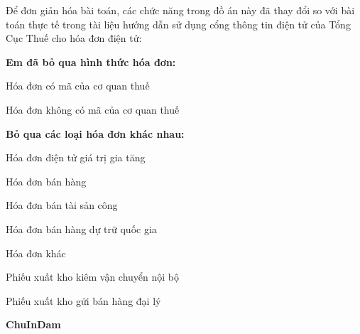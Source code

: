 Để đơn giản hóa bài toán, các chức năng trong đồ án này đã thay đổi so với bài toán thực tế trong tài liệu hướng dẫn sử dụng cổng thông tin điện tử của Tổng Cục Thuế cho hóa đơn điện tử:







\textbf{Em đã bỏ qua hình thức hóa đơn:}







Hóa đơn có mã của cơ quan thuế







Hóa đơn không có mã của cơ quan thuế







\textbf{Bỏ qua các loại hóa đơn khác nhau:}







Hóa đơn điện tử giá trị gia tăng







Hóa đơn bán hàng







Hóa đơn bán tài sản công







Hóa đơn bán hàng dự trữ quốc gia







Hóa đơn khác







Phiếu xuất kho kiêm vận chuyển nội bộ







Phiếu xuất kho gửi bán hàng đại lý







\textbf{ChuInDam}



